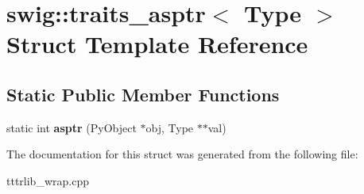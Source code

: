\hypertarget{structswig_1_1traits__asptr}{}\section{swig\+:\+:traits\+\_\+asptr$<$ Type $>$ Struct Template Reference}
\label{structswig_1_1traits__asptr}
\subsection*{Static Public Member Functions}
\begin{DoxyCompactItemize}
\item 
\mbox{\label{structswig_1_1traits__asptr_aa24007f1d4126e9a4162bce7bf231931}} 
static int {\bfseries asptr} (Py\+Object $\ast$obj, Type $\ast$$\ast$val)
\end{DoxyCompactItemize}


The documentation for this struct was generated from the following file\+:\begin{DoxyCompactItemize}
\item 
tttrlib\+\_\+wrap.\+cpp\end{DoxyCompactItemize}
